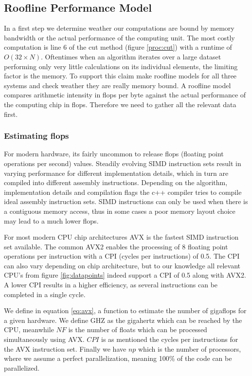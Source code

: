 \documentclass[]{article}
\begin{document}
\subsection{Roofline Performance Model} \label{sec:roof}

In a first step we determine weather our computations are bound by memory bandwidth or the actual performance of the computing unit. The most costly computation is line 6 of the cut method (figure \ref{proc:cut}) with a runtime of $O(32 \times N)$. Oftentimes when an algorithm iterates over a large dataset performing only very little calculations on its individual elements, the limiting factor is the memory. To support this claim make roofline models for all three systems and check weather they are really memory bound. A roofline model compares arithmetic intensity in flops per byte against the actual performance of the computing chip in flops. Therefore we need to gather all the relevant data first.

\subsubsection{Estimating flops}

For modern hardware, its fairly uncommon to release flops (floating point operations per second) values. Steadily evolving SIMD instruction sets result in varying performance for different implementation details, which in turn are compiled into different assembly instructions. Depending on the algorithm, implementation details and compilation flags the c++ compiler tries to compile ideal assembly instruction sets. SIMD instructions can only be used when there is a contiguous memory access, thus in some cases a poor memory layout choice may lead to a much lower flops. 

For most modern CPU chip architectures AVX is the fastest SIMD instruction set available. The common AVX2 enables the processing of 8 floating point operations per instruction with a  CPI (cycles per instructions) of 0.5. The CPI can also vary depending on chip architecture, but to our knowledge all relevant CPU's from figure \ref{fig:datapoints} indeed support a CPI of 0.5 along with AVX2. A lower CPI results in a higher efficiency, as several instructions can be completed in a single cycle. 

We define in equation \ref{eq:avx}, a function to estimate the number of gigaflops for a given hardware. We define GHZ as the gigahertz which can be reached by the CPU, meanwhile $NF$ is the number of floats which can be processed simultaneously using AVX. $CPI$ is as mentioned the cycles per instructions for the AVX instruction set. Finally we have $np$ which is the number of processors, where we assume a perfect parallelization, meaning 100\% of the code can be parallelized.
\end{document}
